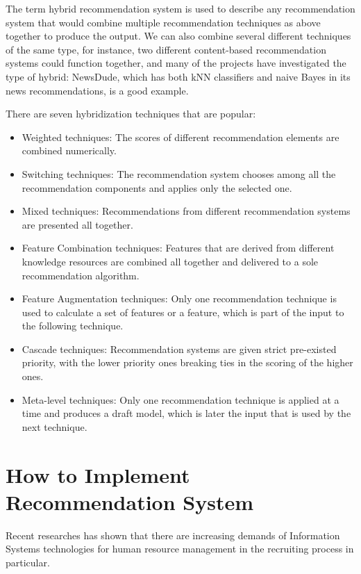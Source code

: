 \documentclass[sigconf]{acmart}
\begin{document}
\par The term hybrid recommendation system is used to describe any recommendation system that would combine multiple recommendation techniques as above together to produce the output. We can also combine several different techniques of the same type, for instance, two different content-based recommendation systems could function together, and many of the projects have investigated the type of hybrid: NewsDude, which has both kNN classifiers and naive Bayes in its news recommendations, is a good example.

\par There are seven hybridization techniques that are popular:

\begin{itemize}
  \item Weighted techniques: The scores of different recommendation elements are combined numerically.
  \item Switching techniques: The recommendation system chooses among all the recommendation components and applies only  the selected one.
  \item Mixed techniques: Recommendations from different recommendation systems are presented all together.
  \item Feature Combination techniques: Features that are derived from different knowledge resources are combined all together and delivered to a sole recommendation algorithm.
  \item Feature Augmentation techniques: Only one recommendation technique is used to calculate a set of features or a feature, which is part of the input to the following technique.
  \item Cascade techniques: Recommendation systems are given strict pre-existed priority, with the lower priority ones breaking ties in the scoring of the higher ones.
  \item Meta-level techniques: Only one recommendation technique is applied at a time and produces a draft model, which is later the input that is used by the next technique.
\end{itemize}


\section{How to Implement Recommendation System}
Recent researches has shown that there are increasing demands of Information Systems technologies for human resource management in the recruiting process in particular. 
\end{document}
